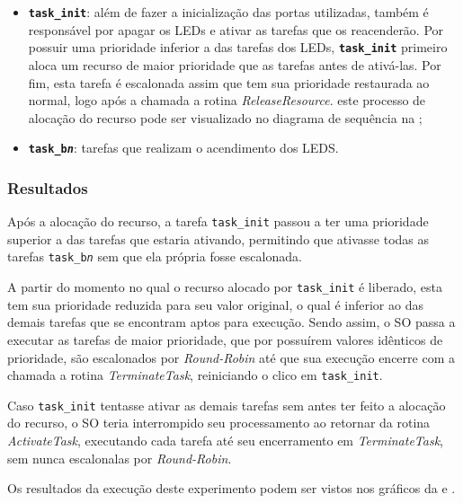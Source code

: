 \begin{itemize}
	\item \textbf{\texttt{task\_init}}: além de fazer a inicialização das portas utilizadas, também é responsável por apagar os LEDs e ativar as tarefas que os reacenderão. Por possuir uma prioridade inferior a das tarefas dos LEDs, \textbf{\texttt{task\_init}} primeiro aloca um recurso de maior prioridade que as tarefas antes de ativá-las. Por fim, esta tarefa é escalonada assim que tem sua prioridade restaurada ao normal, logo após a chamada a rotina \emph{ReleaseResource}. este processo de alocação do recurso pode ser visualizado no diagrama de sequência na ;
	\item \textbf{\texttt{task\_b\textit{n}}}: tarefas que realizam o acendimento dos LEDS.
\end{itemize}


\subsubsection{Resultados}

Após a alocação do recurso, a tarefa \texttt{task\_init} passou a ter uma prioridade superior a das tarefas que estaria ativando, permitindo que ativasse todas as tarefas \texttt{task\_b\textit{n}} sem que ela própria fosse escalonada.

A partir do momento no qual o recurso alocado por \texttt{task\_init} é liberado, esta tem sua prioridade reduzida para seu valor original, o qual é inferior ao das demais tarefas que se encontram aptos para execução. Sendo assim, o SO passa a executar as tarefas de maior prioridade, que por possuírem valores idênticos de prioridade, são escalonados por \emph{Round-Robin} até que sua execução encerre com a chamada a rotina \emph{TerminateTask}, reiniciando o clico em \texttt{task\_init}.

Caso \texttt{task\_init} tentasse ativar as demais tarefas sem antes ter feito a alocação do recurso, o SO teria interrompido seu processamento ao retornar da rotina \emph{ActivateTask}, executando cada tarefa até seu encerramento em \emph{TerminateTask}, sem nunca escalonalas por \emph{Round-Robin}.

Os resultados da execução deste experimento podem ser vistos nos gráficos da  e .

